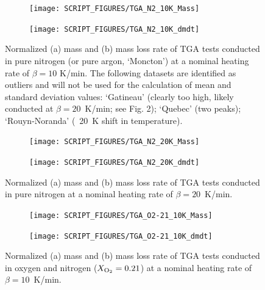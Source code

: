 \documentclass{book}
\begin{document}
\begin{figure} [p]
\centering
\begin{subfigure}[b]{0.85\textwidth}
   \texttt{[image: SCRIPT\_FIGURES/TGA\_N2\_10K\_Mass]}
   \caption{}
   \label{Fig:TGA_N2_10KMass}
\end{subfigure}

\begin{subfigure}[b]{0.85\textwidth}
   \texttt{[image: SCRIPT\_FIGURES/TGA\_N2\_10K\_dmdt]}
   \caption{}
   \label{Fig:TGA_N2_10Kdmdt}
\end{subfigure}

  \caption{Normalized (a) mass and (b) mass loss rate of TGA tests conducted in pure nitrogen (or pure argon, ‘Moncton’) at a nominal heating rate of $\beta = 10$ K/min. The following datasets are identified as outliers and will not be used for the calculation of mean and standard deviation values: `Gatineau' (clearly too high, likely conducted at $\beta=20$~K/min; see Fig. 2); `Quebec' (two peaks); `Rouyn-Noranda' (~20~K shift in temperature).}
  \label{Fig:TGA_N2_10K}
\end{figure}

\begin{figure}[p]
\centering
\begin{subfigure}[b]{0.85\textwidth}
   \texttt{[image: SCRIPT\_FIGURES/TGA\_N2\_20K\_Mass]}
   \caption{}
   \label{Fig:TGA_N2_20KMass}
\end{subfigure}

\begin{subfigure}[b]{0.85\textwidth}
   \texttt{[image: SCRIPT\_FIGURES/TGA\_N2\_20K\_dmdt]}
   \caption{}
   \label{Fig:TGA_N2_20Kdmdt}
\end{subfigure}

  \caption{Normalized (a) mass and (b) mass loss rate of TGA tests conducted in pure nitrogen at a nominal heating rate of $\beta=20$~K/min.}
  \label{Fig:TGA_N2_20K}
\end{figure}


\begin{figure}
\centering
\begin{subfigure}[b]{0.85\textwidth}
   \texttt{[image: SCRIPT\_FIGURES/TGA\_O2-21\_10K\_Mass]}
   \caption{}
   \label{Fig:TGA_O2-21_10KMass}
\end{subfigure}

\begin{subfigure}[b]{0.85\textwidth}
   \texttt{[image: SCRIPT\_FIGURES/TGA\_O2-21\_10K\_dmdt]}
   \caption{}
   \label{Fig:TGA_O2-21_10Kdmdt}
\end{subfigure}

  \caption{Normalized (a) mass and (b) mass loss rate of TGA tests conducted in oxygen and nitrogen ($X_{\rm O_2}=0.21$) at a nominal heating rate of $\beta=10$~K/min.}
  \label{Fig:TGA_O2-21_10K}
\end{figure}
\end{document}

